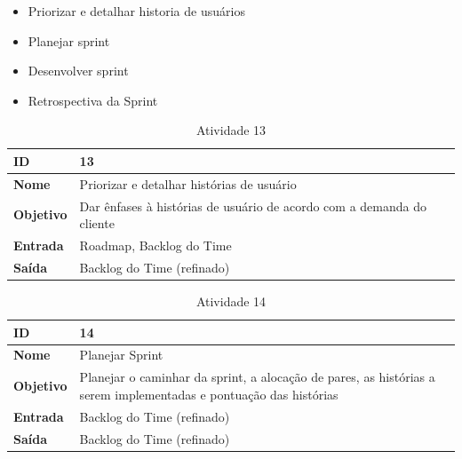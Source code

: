 \begin{itemize}
	\item Priorizar e detalhar historia de usuários
	\item Planejar sprint
	\item Desenvolver sprint
	\item Retrospectiva da Sprint
\end{itemize}

\begin{table}[!h]
	\centering
	\caption{Atividade 13}
	\label{my-label}
	\begin{tabular}{|l|l|}
	\hline
	\textbf{ID}       & 13                                                                    \\ \hline
	\textbf{Nome}     & Priorizar e detalhar histórias de usuário                             \\ \hline
	\textbf{Objetivo} & Dar ênfases à histórias de usuário de acordo com a demanda do cliente \\ \hline
	\textbf{Entrada}  & Roadmap, Backlog do Time                                              \\ \hline
	\textbf{Saída}    & Backlog do Time (refinado)                                            \\ \hline
	\end{tabular}
\end{table}

\begin{table}[!h]
	\centering
	\caption{Atividade 14}
	\label{my-label}
	\begin{tabular}{|l|l|}
	\hline
	\textbf{ID}       & 14                                                                                                               \\ \hline
	\textbf{Nome}     & Planejar Sprint                                                                                                  \\ \hline
	\textbf{Objetivo} &\parbox[t]{7cm}{Planejar o caminhar da sprint, a alocação de pares, as histórias a serem implementadas e pontuação das histórias} \\ \hline
	\textbf{Entrada}  & Backlog do Time (refinado)                                                                                       \\ \hline
	\textbf{Saída}    & Backlog do Time (refinado)                                                                                       \\ \hline
	\end{tabular}
\end{table}

